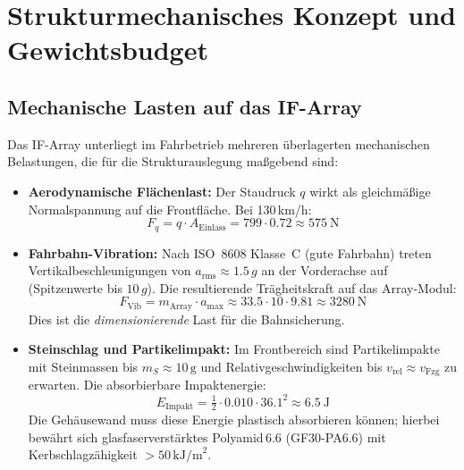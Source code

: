 ﻿\documentclass[12pt, a4paper]{report}
\theoremstyle{definition}
\theoremstyle{remark}
\newcommand{\Aeinlass}{A_{\text{Einlass}}}
\begin{document}
\section{Strukturmechanisches Konzept und Gewichtsbudget}
\label{sec:kfz_struktur}

\subsection{Mechanische Lasten auf das IF-Array}

Das IF-Array unterliegt im Fahrbetrieb mehreren überlagerten mechanischen
Belastungen, die für die Strukturauslegung maßgebend sind:

\begin{itemize}
  \item \textbf{Aerodynamische Flächenlast:} Der Staudruck $q$ wirkt als
        gleichmäßige Normalspannung auf die Frontfläche. Bei 130\,km/h:
        \begin{equation}
          F_q = q \cdot \Aeinlass = 799 \cdot 0.72 \approx \SI{575}{\newton}
          \label{eq:f_stau}
        \end{equation}

  \item \textbf{Fahrbahn-Vibration:} Nach ISO~8608 Klasse~C (gute Fahrbahn)
        treten Vertikalbeschleunigungen von $a_{\text{rms}} \approx 1.5\,g$
        an der Vorderachse auf (Spitzenwerte bis $10\,g$). Die resultierende
        Trägheitskraft auf das Array-Modul:
        \begin{equation}
          F_{\text{Vib}} = m_{\text{Array}} \cdot a_{\text{max}}
          \approx 33.5 \cdot 10 \cdot 9.81 \approx \SI{3280}{\newton}
          \label{eq:f_vib}
        \end{equation}
        Dies ist die \emph{dimensionierende} Last für die Bahnsicherung.

  \item \textbf{Steinschlag und Partikelimpakt:} Im Frontbereich sind
        Partikelimpakte mit Steinmassen bis $m_S \approx 10\,\text{g}$ und
        Relativgeschwindigkeiten bis $v_{\text{rel}} \approx v_{\text{Fzg}}$
        zu erwarten. Die absorbierbare Impaktenergie:
        \begin{equation}
          E_{\text{Impakt}} = \tfrac{1}{2} \cdot 0.010 \cdot 36.1^2
          \approx \SI{6.5}{\joule}
          \label{eq:e_impakt}
        \end{equation}
        Die Gehäusewand muss diese Energie plastisch absorbieren können;
        hierbei bewährt sich glasfaserverstärktes Polyamid\,6.6 (GF30-PA6.6)
        mit Kerbschlagzähigkeit $> 50\,\text{kJ/m}^2$.
\end{itemize}
\end{document}
